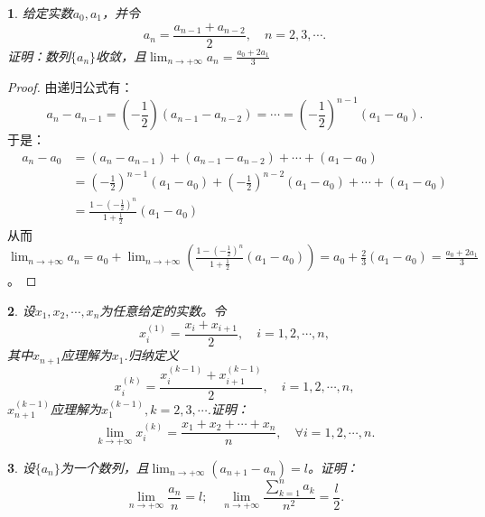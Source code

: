 \documentclass[utf8]{book}
\newtheorem{example}{}[section]             %
\begin{document}
\begin{example}
给定实数$a_0,a_1$，并令$$a_n=\frac{a_{n-1}+a_{n-2}}{2}, \quad n = 2,3,\cdots.$$
证明：数列$\{a_n\}$收敛，且$\displaystyle\lim_{n\to +\infty}a_n =\frac{a_0+2a_1}{3}$
\end{example}
\begin{proof}
由递归公式有：
$$a_n -a_{n-1} = \left(-\frac{1}{2}\right)\left(a_{n-1}-a_{n-2}\right)=\cdots= \left(-\frac{1}{2}\right)^{n-1}(a_1-a_0).$$
于是：
\begin{equation*}
\begin{split}
a_n-a_0 &= (a_n-a_{n-1}) + (a_{n-1}-a_{n-2}) +\cdots+(a_1-a_0)\\
&=\left(-\frac{1}{2}\right)^{n-1}(a_1-a_0) + \left(-\frac{1}{2}\right)^{n-2}(a_1-a_0) + \cdots + (a_1-a_0)\\
&=\frac{1-\left(-\frac{1}{2}\right)^{n}}{1+\frac{1}{2}}(a_1-a_0)
\end{split}
\end{equation*}
从而$\displaystyle\lim_{n\to +\infty}a_n =a_0+\displaystyle\lim_{n\to +\infty}\left(\frac{1-\left(-\frac{1}{2}\right)^{n}}{1+\frac{1}{2}}(a_1-a_0)\right)=a_0+\frac{2}{3}(a_1-a_0) = \frac{a_0+2a_1}{3}$。
\end{proof}
\begin{example}
设$x_1,x_2,\cdots, x_n$为任意给定的实数。令
$$x_i^{(1)}=\frac{x_i+x_{i+1}}{2}, \quad i=1,2,\cdots, n,$$
其中$x_{n+1}$应理解为$x_1$.归纳定义
$$x_i^{(k)}=\frac{x_i^{(k-1)}+x_{i+1}^{(k-1)}}{2}, \quad i=1,2,\cdots, n,$$
$x^{(k-1)}_{n+1}$应理解为$x_1^{(k-1)},k=2,3,\cdots$.证明：
$$\displaystyle\lim_{k\to +\infty}x_i^{(k)}=\frac{x_1+x_2+\cdots+x_n}{n}, \quad \forall i = 1,2,\cdots,n.$$
\end{example}
\begin{example}
设$\{a_n\}$为一个数列，且$\displaystyle\lim_{n\to +\infty}(a_{n+1}-a_n) = l$。证明：$$\displaystyle\lim_{n\to +\infty}\frac{a_n}{n} = l; \quad \displaystyle\lim_{n\to +\infty}\frac{\displaystyle\sum_{k=1}^na_k}{n^2} =\frac{l}{2}.$$
\end{example}
\end{document}
